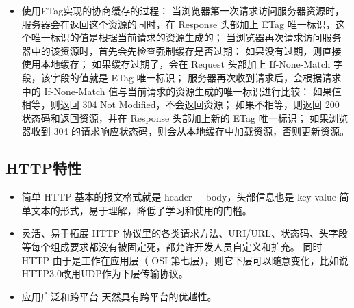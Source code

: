 \documentclass[11pt]{article}
\begin{document}
\begin{itemize}
\begin{itemize}
\item 使用ETag实现的协商缓存的过程：
当浏览器第一次请求访问服务器资源时，服务器会在返回这个资源的同时，在 Response 头部加上 ETag 唯一标识，这个唯一标识的值是根据当前请求的资源生成的；
当浏览器再次请求访问服务器中的该资源时，首先会先检查强制缓存是否过期：
  如果没有过期，则直接使用本地缓存；
  如果缓存过期了，会在 Request 头部加上 If-None-Match 字段，该字段的值就是 ETag 唯一标识；
服务器再次收到请求后，会根据请求中的 If-None-Match 值与当前请求的资源生成的唯一标识进行比较：
  如果值相等，则返回 304 Not Modified，不会返回资源；
  如果不相等，则返回 200 状态码和返回资源，并在 Response 头部加上新的 ETag 唯一标识；
如果浏览器收到 304 的请求响应状态码，则会从本地缓存中加载资源，否则更新资源。
\end{itemize}
\end{itemize}
\subsection{HTTP特性}
\label{sec:orgdbf79c9}
\begin{itemize}
\item 简单
HTTP 基本的报文格式就是 header + body，头部信息也是 key-value 简单文本的形式，易于理解，降低了学习和使用的门槛。
\item 灵活、易于拓展
HTTP 协议里的各类请求方法、URI/URL、状态码、头字段等每个组成要求都没有被固定死，都允许开发人员自定义和扩充。
同时 HTTP 由于是工作在应用层（ OSI 第七层），则它下层可以随意变化，比如说\- HTTP3.0改用UDP作为下层传输协议。
\item 应用广泛和跨平台
天然具有跨平台的优越性。
\end{itemize}
\end{document}
